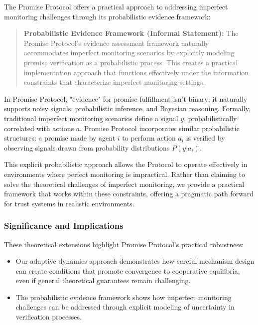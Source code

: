 \documentclass[11pt]{article}
\begin{document}
The Promise Protocol offers a practical approach to addressing imperfect monitoring challenges through its probabilistic evidence framework:

\begin{quote}
\textbf{Probabilistic Evidence Framework (Informal Statement):}
The Promise Protocol's evidence assessment framework naturally accommodates imperfect monitoring scenarios by explicitly modeling promise verification as a probabilistic process. This creates a practical implementation approach that functions effectively under the information constraints that characterize imperfect monitoring settings.
\end{quote}

In Promise Protocol, "evidence" for promise fulfillment isn't binary; it naturally supports noisy signals, probabilistic inference, and Bayesian reasoning. Formally, traditional imperfect monitoring scenarios define a signal \(y\), probabilistically correlated with actions \(a\). Promise Protocol incorporates similar probabilistic structures: a promise made by agent \(i\) to perform action \(a_i\) is verified by observing signals drawn from probability distributions \(P(y|a_i)\).

This explicit probabilistic approach allows the Protocol to operate effectively in environments where perfect monitoring is impractical. Rather than claiming to solve the theoretical challenges of imperfect monitoring, we provide a practical framework that works within these constraints, offering a pragmatic path forward for trust systems in realistic environments.
\subsubsection{Significance and Implications}
\label{sec:org490db49}

These theoretical extensions highlight Promise Protocol's practical robustness:

\begin{itemize}
\item Our adaptive dynamics approach demonstrates how careful mechanism design can create conditions that promote convergence to cooperative equilibria, even if general theoretical guarantees remain challenging.
\item The probabilistic evidence framework shows how imperfect monitoring challenges can be addressed through explicit modeling of uncertainty in verification processes.
\end{itemize}
\end{document}
